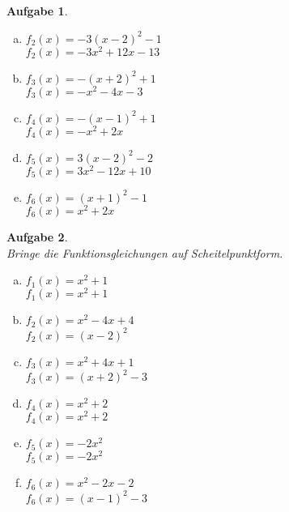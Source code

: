 \documentclass[12pt,fleqn]{article}
\theoremstyle{aufg}
\newtheorem{aufgabe}{Aufgabe}
\theoremstyle{bsp}
\begin{document}
\begin{flushleft}
\begin{aufgabe}
\begin{multicols}{3}
\begin{enumerate}[a)]
\item 
$f_2(x)=- 3 \left(x - 2\right)^{2} - 1$ \\ 
$f_2(x)=- 3 x^{2} + 12 x - 13$ \\ 

\item 
$f_3(x)=- \left(x + 2\right)^{2} + 1$ \\ 
$f_3(x)=- x^{2} - 4 x - 3$ \\ 

\item 
$f_4(x)=- \left(x - 1\right)^{2} + 1$ \\ 
$f_4(x)=- x^{2} + 2 x$ \\ 

\item 
$f_5(x)=3 \left(x - 2\right)^{2} - 2$ \\ 
$f_5(x)=3 x^{2} - 12 x + 10$ \\ 

\item 
$f_6(x)=\left(x + 1\right)^{2} - 1$ \\ 
$f_6(x)=x^{2} + 2 x$ \\ 

\end{enumerate} 
\end{multicols} 
\end{aufgabe} 
\begin{aufgabe} ~ \\ 
Bringe die Funktionsgleichungen auf Scheitelpunktform. \\ 
\begin{multicols}{3} 
\begin{enumerate}[a)] 
\item 
$f_1(x)=x^{2} + 1$ \\ 
$f_1(x)=x^{2} + 1$ \\ 

\item 
$f_2(x)=x^{2} - 4 x + 4$ \\ 
$f_2(x)=\left(x - 2\right)^{2}$ \\ 

\item 
$f_3(x)=x^{2} + 4 x + 1$ \\ 
$f_3(x)=\left(x + 2\right)^{2} - 3$ \\ 

\item 
$f_4(x)=x^{2} + 2$ \\ 
$f_4(x)=x^{2} + 2$ \\ 

\item 
$f_5(x)=- 2 x^{2}$ \\ 
$f_5(x)=- 2 x^{2}$ \\ 

\item 
$f_6(x)=x^{2} - 2 x - 2$ \\ 
$f_6(x)=\left(x - 1\right)^{2} - 3$ \\ 

\end{enumerate} 
\end{multicols} 
\end{aufgabe} 
\end{flushleft} 
\end{document}
